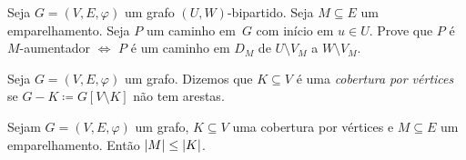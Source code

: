 \documentclass[10pt,reqno]{amsart}
\begin{document}
\begin{exercise}
  Seja \(G = (V,E,\varphi)\) um grafo \((U,W)\)-bipartido.  Seja
  \(M \subseteq E\) um emparelhamento.  Seja \(P\) um caminho em~\(G\)
  com início em \(u \in U\).  Prove que \(P\) é \(M\)-aumentador
  \(\iff\) \(P\) é um caminho em \(D_M\) de \(U \setminus V_M\) a
  \(W \setminus V_M\).
\end{exercise}

Seja \(G = (V,E,\varphi)\) um grafo.  Dizemos que \(K \subseteq V\) é
uma \emph{cobertura por vértices} se
\(G - K \coloneqq G[V\setminus K]\) não tem arestas.

\begin{proposition}
  Sejam \(G = (V,E,\varphi)\) um grafo, \(K \subseteq V\) uma
  cobertura por vértices e \(M \subseteq E\) um emparelhamento.  Então
  \(\lvert M\rvert \leq \lvert K\rvert\).
\end{proposition}
\end{document}
